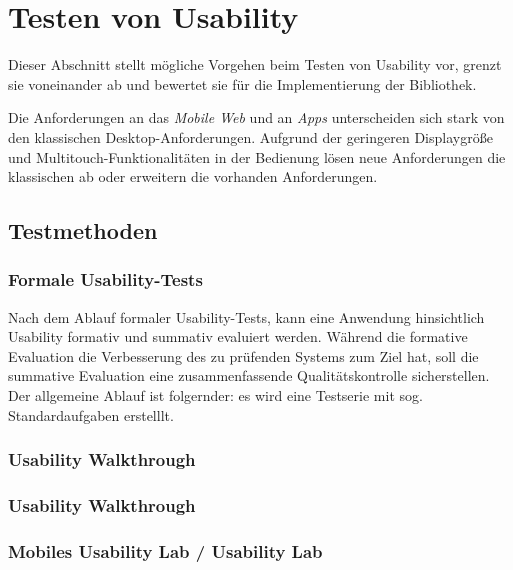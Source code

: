 \section{Testen von Usability}
\label{usability_testing}

Dieser Abschnitt stellt mögliche Vorgehen beim Testen von Usability vor, grenzt sie voneinander ab und bewertet sie für die Implementierung der Bibliothek. 

Die Anforderungen an das \textit{Mobile Web} und an \textit{Apps} unterscheiden sich stark von den klassischen Desktop-Anforderungen. Aufgrund der geringeren Displaygröße und Multitouch-Funktionalitäten in der Bedienung lösen neue Anforderungen die klassischen ab oder erweitern die vorhanden Anforderungen. 

\subsection{Testmethoden \label{sec:testmethoden}}

\subsubsection{Formale Usability-Tests}

Nach dem Ablauf formaler Usability-Tests, kann eine Anwendung hinsichtlich Usability formativ und summativ evaluiert werden. Während die formative Evaluation die Verbesserung des zu prüfenden Systems zum Ziel hat, soll die summative Evaluation eine zusammenfassende Qualitätskontrolle sicherstellen. 
Der allgemeine Ablauf ist folgernder: es wird eine Testserie mit sog. Standardaufgaben erstelllt. 

\subsubsection{Usability Walkthrough}

\subsubsection{Usability Walkthrough}

\subsubsection{Mobiles Usability Lab / Usability Lab}



\cite{usabilityblog_wasBeachten}

\cite{usabilityblog_eResult}